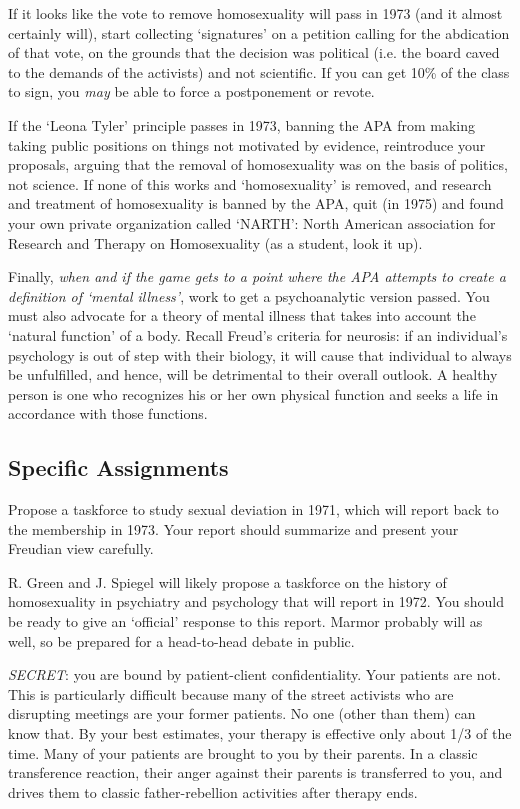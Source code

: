 \begin{refsection}
If it looks like the vote to remove homosexuality will pass in 1973 (and it almost certainly will), start collecting `signatures' on a petition calling for the abdication of that vote, on the grounds that the decision was political (i.e. the board caved to the demands of the activists) and not scientific. If you can get 10\% of the class to sign, you \emph{may} be able to force a postponement or revote.

If the `Leona Tyler' principle passes in 1973, banning the APA from making taking public positions on things not motivated by evidence, reintroduce your proposals, arguing that the removal of homosexuality was on the basis of politics, not science. If none of this works and `homosexuality' is removed, and research and treatment of homosexuality is banned by the APA, quit (in 1975) and found your own private organization called `NARTH': North American association for Research and Therapy on Homosexuality (as a student, look it up).

Finally, \emph{when and if the game gets to a point where the APA attempts to create a definition of `mental illness'}, work to get a psychoanalytic version passed. You must also advocate for a theory of mental illness that takes into account the `natural function' of a body. Recall Freud's criteria for neurosis: if an individual's psychology is out of step with their biology, it will cause that individual to always be unfulfilled, and hence, will be detrimental to their overall outlook. A healthy person is one who recognizes his or her own physical function and seeks a life in accordance with those functions.

\subsection{Specific Assignments}
\label{specificassignments}

Propose a taskforce to study sexual deviation in 1971, which will report back to the membership in 1973. Your report should summarize and present your Freudian view carefully.

R. Green and J. Spiegel will likely propose a taskforce on the history of homosexuality in psychiatry and psychology that will report in 1972. You should be ready to give an `official' response to this report. Marmor probably will as well, so be prepared for a head-to-head debate in public.

\emph{SECRET}: you are bound by patient-client confidentiality. Your patients are not. This is particularly difficult because many of the street activists who are disrupting meetings are your former patients. No one (other than them) can know that. By your best estimates, your therapy is effective only about 1\slash 3 of the time. Many of your patients are brought to you by their parents. In a classic transference reaction, their anger against their parents is transferred to you, and drives them to classic father-rebellion activities after therapy ends. 


\end{refsection}
